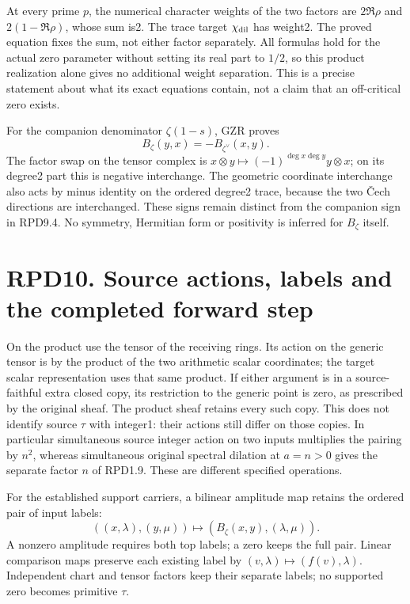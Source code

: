 At every prime \(p\), the numerical character weights of the two factors
are \(2\Re\rho\) and \(2(1-\Re\rho)\), whose sum is2. The trace target
\(\chi_{\rm dil}\) has weight2. The proved equation fixes the sum, not
either factor separately. All formulas hold for the actual zero
parameter without setting its real part to \(1/2\), so this product
realization alone gives no additional weight separation. This is a
precise statement about what its exact equations contain, not a claim
that an off-critical zero exists.

For the companion denominator \(\zeta(1-s)\), GZR proves \[
B_\zeta(y,x)=-B_{\zeta^\vee}(x,y).
\tag{RPD9.4}
\] The factor swap on the tensor complex is
\(x\otimes y\mapsto(-1)^{\deg x\deg y}y\otimes x\); on its degree2 part
this is negative interchange. The geometric coordinate interchange also
acts by minus identity on the ordered degree2 trace, because the two
Čech directions are interchanged. These signs remain distinct from the
companion sign in RPD9.4. No symmetry, Hermitian form or positivity is
inferred for \(B_\zeta\) itself.

\section{RPD10. Source actions, labels and the completed forward
step}\label{rpd10.-source-actions-labels-and-the-completed-forward-step}

On the product use the tensor of the receiving rings. Its action on the
generic tensor is by the product of the two arithmetic scalar
coordinates; the target scalar representation uses that same product. If
either argument is in a source-faithful extra closed copy, its
restriction to the generic point is zero, as prescribed by the original
sheaf. The product sheaf retains every such copy. This does not identify
source \(\tau\) with integer1: their actions still differ on those
copies. In particular simultaneous source integer action on two inputs
multiplies the pairing by \(n^2\), whereas simultaneous original
spectral dilation at \(a=n>0\) gives the separate factor \(n\) of
RPD1.9. These are different specified operations.

For the established support carriers, a bilinear amplitude map retains
the ordered pair of input labels: \[
((x,\lambda),(y,\mu))\longmapsto
(B_\zeta(x,y),(\lambda,\mu)).
\] A nonzero amplitude requires both top labels; a zero keeps the full
pair. Linear comparison maps preserve each existing label by
\((v,\lambda)\mapsto(f(v),\lambda)\). Independent chart and tensor
factors keep their separate labels; no supported zero becomes primitive
\(\tau\).

